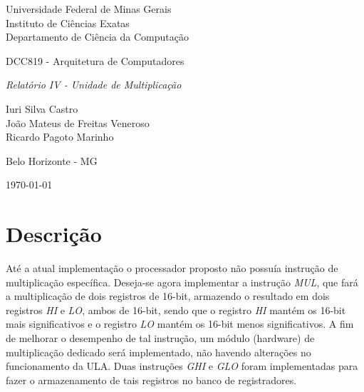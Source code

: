 \documentclass[11pt,a4paper,titlepage]{article}
\newcommand{\titulo}{\textit{Relatório IV - Unidade de Multiplicação}}
\begin{document}
\begin{titlepage}
\begin{center}

\begin{large}
Universidade Federal de Minas Gerais\\
Instituto de Ciências Exatas\\
Departamento de Ciência da Computação\\
\end{large}

\vspace{20mm}

\begin{Large}
DCC819 - Arquitetura de Computadores
\end{Large}

\vspace{20mm}

\begin{LARGE}
\titulo
\end{LARGE}


\vspace{30mm}

\begin{Large}
\begin{center}
Iuri Silva Castro\\ João Mateus de Freitas Veneroso\\ Ricardo Pagoto Marinho \\
\end{center}
\end{Large}


\vspace{60mm}

{\sc Belo Horizonte - MG}

{\sc \today}

\end{center}
\end{titlepage}


\section{Descrição}\label{sec:desc}

Até a atual implementação o processador proposto não possuía instrução de multiplicação específica. Deseja-se agora implementar a instrução \textit{MUL}, que fará a multiplicação de dois registros de 16-bit, armazendo o resultado em dois registros \textit{HI} e \textit{LO}, ambos de 16-bit, sendo que o registro \textit{HI} mantém os 16-bit mais significativos e o registro \textit{LO} mantém os 16-bit menos significativos. A fim de melhorar o desempenho de tal instrução, um módulo (hardware) de multiplicação dedicado será implementado, não havendo alterações no funcionamento da ULA. Duas instruções \textit{GHI} e \textit{GLO} foram implementadas para fazer o armazenamento de tais registros no banco de registradores.
\end{document}
